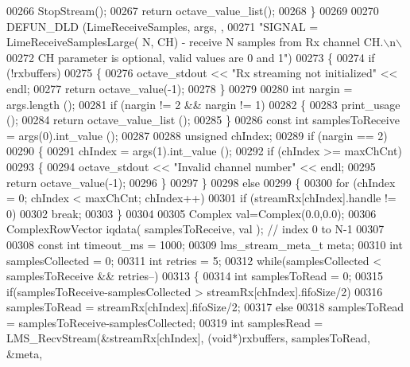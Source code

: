\begin{DoxyCode}
00266     StopStream();
00267     \textcolor{keywordflow}{return} octave\_value\_list();
00268 \}
00269 
00270 DEFUN_DLD (LimeReceiveSamples, args, ,
00271 \textcolor{stringliteral}{"SIGNAL = LimeReceiveSamplesLarge( N, CH) - receive N samples from Rx channel CH.\(\backslash\)n\(\backslash\)}
00272 \textcolor{stringliteral}{CH parameter is optional, valid values are 0 and 1"})
00273 \{
00274     \textcolor{keywordflow}{if} (!rxbuffers)
00275     \{
00276         octave\_stdout << \textcolor{stringliteral}{"Rx streaming not initialized"} << endl;
00277         \textcolor{keywordflow}{return} octave\_value(-1);
00278     \}
00279 
00280     \textcolor{keywordtype}{int} nargin = args.length ();
00281     \textcolor{keywordflow}{if} (nargin != 2 && nargin != 1)
00282     \{
00283         print\_usage ();
00284         \textcolor{keywordflow}{return} octave\_value\_list ();
00285     \}
00286     \textcolor{keyword}{const} \textcolor{keywordtype}{int} samplesToReceive = args(0).int\_value ();
00287 
00288     \textcolor{keywordtype}{unsigned} chIndex;
00289     \textcolor{keywordflow}{if} (nargin == 2)
00290     \{
00291         chIndex = args(1).int\_value ();
00292         \textcolor{keywordflow}{if} (chIndex >= maxChCnt)
00293         \{
00294             octave\_stdout << \textcolor{stringliteral}{"Invalid channel number"} << endl;
00295             \textcolor{keywordflow}{return} octave\_value(-1);
00296         \}
00297     \}
00298     \textcolor{keywordflow}{else}
00299     \{
00300         \textcolor{keywordflow}{for} (chIndex = 0; chIndex < maxChCnt; chIndex++)
00301             \textcolor{keywordflow}{if} (streamRx[chIndex].handle != 0)
00302                 \textcolor{keywordflow}{break};
00303     \}
00304 
00305     Complex val=Complex(0.0,0.0);
00306     ComplexRowVector iqdata( samplesToReceive, val ); \textcolor{comment}{// index 0 to N-1}
00307 
00308     \textcolor{keyword}{const} \textcolor{keywordtype}{int} timeout_ms = 1000;
00309     lms_stream_meta_t meta;
00310     \textcolor{keywordtype}{int} samplesCollected = 0;
00311     \textcolor{keywordtype}{int} retries = 5;
00312     \textcolor{keywordflow}{while}(samplesCollected < samplesToReceive && retries--)
00313     \{
00314         \textcolor{keywordtype}{int} samplesToRead = 0;
00315         \textcolor{keywordflow}{if}(samplesToReceive-samplesCollected > streamRx[chIndex].fifoSize/2)
00316             samplesToRead = streamRx[chIndex].fifoSize/2;
00317         \textcolor{keywordflow}{else}
00318             samplesToRead = samplesToReceive-samplesCollected;
00319         \textcolor{keywordtype}{int} samplesRead = LMS_RecvStream(&streamRx[chIndex], (\textcolor{keywordtype}{void}*)rxbuffers, samplesToRead, &meta, 

\end{DoxyCode}

